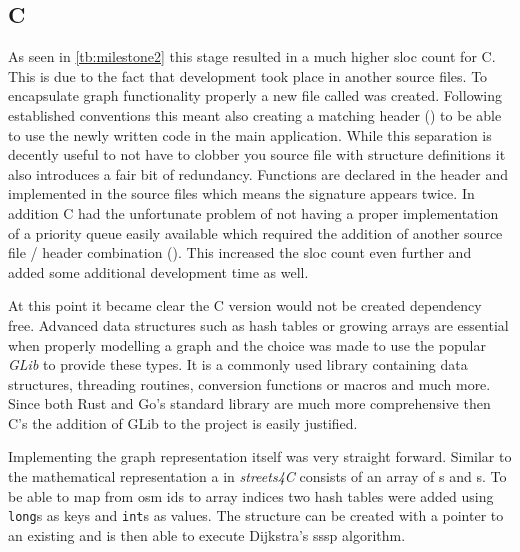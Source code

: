 \subsection{C}
\label{subsec:Implementation::Graph_Representation::C}

As seen in \autoref{tb:milestone2} this stage resulted in a much higher \gls{sloc} count for C. This is due to the fact that development took place in another source files. To encapsulate graph functionality properly a new file called  was created. Following established conventions this meant also creating a matching header () to be able to use the newly written code in the main application. While this separation is decently useful to not have to clobber you source file with structure definitions it also introduces a fair bit of redundancy. Functions are declared in the header and implemented in the source files which means the signature appears twice. In addition C had the unfortunate problem of not having a proper implementation of a priority queue easily available which required the addition of another source file / header combination (). This increased the \gls{sloc} count even further and added some additional development time as well.

At this point it became clear the C version would not be created dependency free. Advanced data structures such as hash tables or growing arrays are essential when properly modelling a graph and the choice was made to use the popular \textit{GLib} to provide these types. It is a commonly used library containing data structures, threading routines, conversion functions or macros and much more. Since both Rust and Go's standard library are much more comprehensive then C's the addition of GLib to the project is easily justified.

Implementing the graph representation itself was very straight forward. Similar to the mathematical representation a  in \textit{streets4C} consists of an array of s and s. To be able to map from \gls{osm} ids to array indices two hash tables were added using \lstinline[style=c]{long}s as keys and \lstinline[style=c]{int}s as values. The  structure can be created with a pointer to an existing  and is then able to execute Dijkstra's \acrshort{sssp} algorithm.
\\


